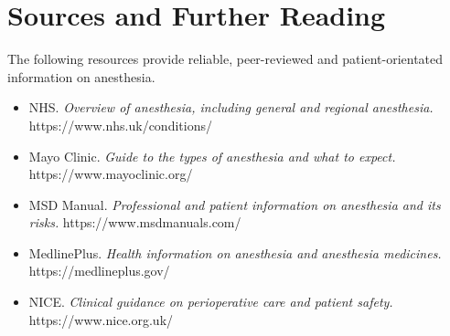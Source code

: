 \section*{Sources and Further Reading}
The following resources provide reliable, peer-reviewed and patient-orientated information on anesthesia.

\begin{itemize}
    \item NHS. \textit{Overview of anesthesia, including general and regional anesthesia.} https://www.nhs.uk/conditions/
    \item Mayo Clinic. \textit{Guide to the types of anesthesia and what to expect.} https://www.mayoclinic.org/
    \item MSD Manual. \textit{Professional and patient information on anesthesia and its risks.} https://www.msdmanuals.com/
    \item MedlinePlus. \textit{Health information on anesthesia and anesthesia medicines.} https://medlineplus.gov/
    \item NICE. \textit{Clinical guidance on perioperative care and patient safety.} https://www.nice.org.uk/
\end{itemize}
